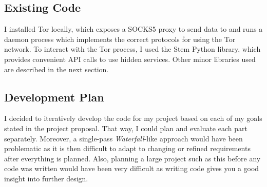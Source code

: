 \documentclass[diss.tex]{subfiles}
\begin{document}
\subsection{Existing Code}
I installed Tor locally, which exposes a SOCKS5 proxy to send data to and runs a daemon process which implements the correct protocols for using the Tor network. To interact with the Tor process, I used the Stem \cite{stem} Python library, which provides convenient API calls to use hidden services. Other minor libraries used are described in the next section.

\subsection{Development Plan}
I decided to iteratively develop the code for my project based on each of my goals stated in the project proposal. That way, I could plan and evaluate each part separately. Moreover, a single-pass \textit{Waterfall}-like approach would have been problematic as it is then difficult to adapt to changing or refined requirements after everything is planned. Also, planning a large project such as this before any code was written would have been very difficult as writing code gives you a good insight into further design.
\end{document}
